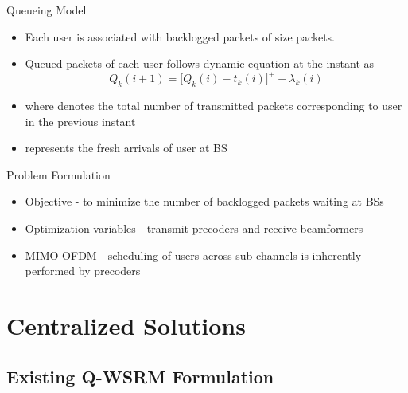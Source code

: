 \documentclass[9pt]{beamer}
\begin{document}
\begin{frame}{Queueing Model}
\begin{itemize}
\item Each user is associated with backlogged packets of size  packets.
\item Queued packets  of each user follows dynamic equation at the  instant as
\begin{equation}
Q_k(i+1) = \Big [ Q_k(i) - t_k(i) \Big ]^+ + \lambda_k(i)
\label{eqn-2a}
\end{equation}
\item where  denotes the total number of transmitted packets corresponding to user  in the previous  instant
\item {} represents the fresh arrivals of user  at \ac{BS} 
\end{itemize}
\end{frame}

\begin{frame}{Problem Formulation}
\begin{itemize}
\item {\color{red}Objective} - to minimize the number of backlogged packets waiting at \acp{BS}
\item {\color{red}Optimization variables} - transmit precoders and receive beamformers
\item {\color{red}\ac{MIMO}-\ac{OFDM}} - scheduling of users across sub-channels is inherently performed by precoders
\end{itemize}
\end{frame}

\section{Centralized Solutions}

\subsection{Existing \acs{Q-WSRM} Formulation}
\end{document}

